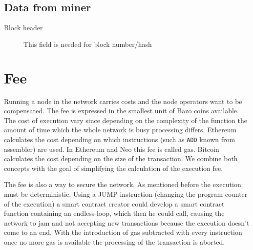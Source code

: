 \subsection{Data from miner}
\begin{description}
  \item[Block header] This field is needed for block number/hash
\end{description}

\section{Fee} \label{fee}
Running a node in the network carries costs and the node operators want to be compensated. The fee is expressed in the smallest unit of Bazo coins available. The cost of execution vary since depending on the complexity of the function the amount of time which the whole network is busy processing differs. Ethereum calculates the cost depending on which instructions (such as \texttt{ADD} known from assembler) are used. In Ethereum and Neo this fee is called gas. Bitcoin calculates the cost depending on the size of the transaction. We combine both concepts with the goal of simplifying the calculation of the execution fee.

The fee is also a way to secure the network. As mentioned before the execution must be deterministic. Using a JUMP instruction (changing the program counter of the execution) a smart contract creator could develop a smart contract function containing an endless-loop, which then he could call, causing the network to jam and not accepting new transactions because the execution doesn't come to an end. With the introduction of gas subtracted with every instruction once no more gas is available the processing of the transaction is aborted.